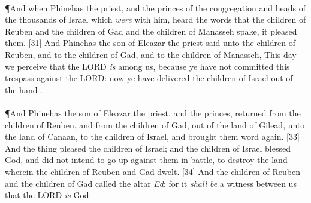 \\
\P \textcolor[cmyk]{0.99998,1,0,0}{And when Phinehas the priest, and the princes of the congregation and heads of the thousands of Israel which \emph{were} with him, heard the words that the children of Reuben and the children of Gad and the children of Manasseh spake, it pleased them.}
[31] \textcolor[cmyk]{0.99998,1,0,0}{And Phinehas the son of Eleazar the priest said unto the children of Reuben, and to the children of Gad, and to the children of Manasseh, This day we perceive that the LORD \emph{is} among us, because ye have not committed this trespass against the LORD: now ye have delivered the children of Israel out of the hand .}\\
\\
\P \textcolor[cmyk]{0.99998,1,0,0}{And Phinehas the son of Eleazar the priest, and the princes, returned from the children of Reuben, and from the children of Gad, out of the land of Gilead, unto the land of Canaan, to the children of Israel, and brought them word again.}
[33] \textcolor[cmyk]{0.99998,1,0,0}{And the thing pleased the children of Israel; and the children of Israel blessed God, and did not intend to go up against them in battle, to destroy the land wherein the children of Reuben and Gad dwelt.}
[34] \textcolor[cmyk]{0.99998,1,0,0}{And the children of Reuben and the children of Gad called the altar \emph{Ed}: for it \emph{shall} \emph{be} a witness between us that the LORD \emph{is} God.}